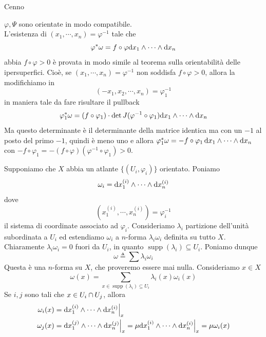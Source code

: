 \documentclass[a4paper]{article}
\begin{document}
\begin{snippetproof}{Cenno}
\begin{ffiproof}
        \(\varphi, \Psi\) sono orientate in modo compatibile. \\
        L'esistenza di \((x_1, \cdots, x_n) = \varphi^{-1}\) tale che
        \[
            \varphi^\ast \omega = f \circ \varphi \text dx_1 \wedge \cdots \wedge \text dx_n
        \]
        abbia \(f \circ \varphi > 0\) è provata in modo simile al teorema sulla orientabilità
        delle ipersuperfici. Cioè, se \((x_1, \cdots, x_n) = \varphi^{-1}\) non soddisfa
        \(f \circ \varphi > 0\), allora la modifichiamo in
        \[
            (-x_1, x_2, \cdots, x_n) = \varphi_1^{-1}
        \]
        in maniera tale da fare risultare il pullback
        \[
            \varphi_1^\ast \omega = (f \circ \varphi_1) \cdot \det J (\varphi^{-1} \circ \varphi_1) \text dx_1 \wedge\cdots\wedge\text dx_n
        \]
        Ma questo determinante è il determinante della matrice identica ma con un \(-1\) al posto del primo \(-1\),
        quindi è meno uno e allora \(\varphi_1^\ast \omega = -f \circ \varphi_1 \, \text dx_1\wedge\cdots\wedge\text dx_n\)
        con \(- f \circ \varphi_1 = -(f \circ \varphi)(\varphi^{-1} \circ \varphi_1) > 0\).
        \item Supponiamo che \(X\) abbia un atlante \(\{(U_i, \varphi_i)\}\) orientato. Poniamo \[
            \omega_i = \text dx_1^{(i)} \wedge \cdots \wedge \text dx_n^{(i)}
        \]
        dove \[
            \left(x_1^{(i)}, \cdots, x_n^{(i)}\right) = \varphi_i^{-1}
        \]
        il sistema di coordinate associato ad \(\varphi_i\).
        Consideriamo \(\lambda_i\) partizione dell'unità subordinata a \(U_i\) ed estendiamo
        \(\omega_i\) a \(n\)-forma \(\lambda_i\omega_i\) definita su tutto \(X\).
        Chiaramente \(\lambda_i\omega_i = 0\) fuori da \(U_i\), in quanto
        \(\operatorname{supp}(\lambda_i) \subseteq U_i\).
        Poniamo dunque \[
            \omega \triangleq \sum \lambda_i \omega_i
        \]
        Questa è una \(n\)-forma su \(X\),
        che proveremo essere mai nulla. Consideriamo \(x \in X\)
        \[
            \omega(x) = \sum_{x \in \operatorname{supp}(\lambda_i) \subseteq U_i} \lambda_i(x) \omega_i(x)
        \]
        Se \(i,j\) sono tali che \(x \in U_i \cap U_j\), allora \begin{align*}
            \omega_i(x) &= \restr{
                \text dx_1^{(i)} \wedge \cdots \wedge \text dx_n^{(i)}
            }{x} \\
            \omega_j(x) &= \restr{
                \text dx_1^{(j)} \wedge \cdots \wedge \text dx_n^{(j)}
            }{x} = \mu \restr{\text dx_1^{(i)} \wedge \cdots \wedge \text dx_n^{(i)}}{x} = \mu\omega_i(x)

\end{align*}
\end{ffiproof}
\end{snippetproof}
\end{document}
